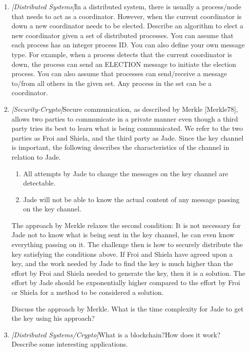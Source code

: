 \documentclass{article}
\begin{document}
\begin{enumerate}
  	\item{\textit{[Distributed Systems]}In a distributed system, there is usually a process/node that needs to act as a coordinator. However, when the current coordinator is down a new coordinator needs to be elected. Describe an algorithm to elect a new coordinator given a set of distributed processes. You can assume that each process has an integer process ID. You can  also define your own message type. For example, when a process detects that the current coordinator is down, the process can send an ELECTION message to initiate the election process. You can also assume that processes can send/receive a message to/from all others in the given set. Any process in the set can be a coordinator.}
  	
	\item{\textit{[Security-Crypto]}Secure communication, as described by Merkle [Merkle78], allows two parties to communicate in a private manner even though a third party tries its best to learn what is being communicated. We refer to the two parties as Froi and Shiela, and the third party as Jade. Since the key channel is important, the following describes the characteristics of the channel in relation to Jade.

\begin{enumerate}
\item All attempts by Jade to change the messages on the key channel are detectable.
\item Jade will not be able to know the actual content of any message passing on the key channel.


\end{enumerate}

The approach by Merkle relaxes the second condition: It is not necessary for Jade not to know what is being sent in the key channel, he can even know everything passing on it. The challenge then is how
to securely distribute the key satisfying the conditions above. If Froi and Shiela have agreed upon a key, and the work needed by Jade to find the key is much higher than the effort by Froi and Shiela needed
to generate the key, then it is a solution. The effort by Jade should be exponentially higher compared to the effort by Froi or Shiela for a method to be considered a solution.

Discuss the approach by Merkle. What is the time complexity for Jade to get the key using his approach?}  	

	\item{\textit{[Distributed Systems/Crypto]}What is a blockchain?How does it work? Describe some interesting applications.}
	

\end{enumerate}
\end{document}
